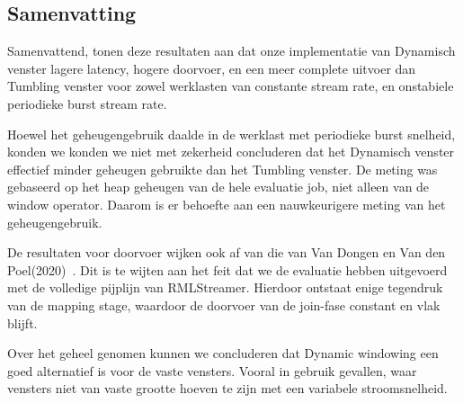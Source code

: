\subsection{Samenvatting}
\label{sec:Result Summary}

Samenvattend, tonen deze resultaten aan dat onze implementatie van Dynamisch venster 
lagere latency, hogere doorvoer, en een meer complete 
uitvoer dan Tumbling venster voor zowel 
werklasten van constante stream rate, en onstabiele periodieke burst stream rate.

Hoewel het geheugengebruik daalde in de werklast met periodieke burst snelheid, konden we 
konden we niet met zekerheid concluderen dat het Dynamisch venster effectief minder geheugen gebruikte
dan het Tumbling venster. De meting was gebaseerd op het heap geheugen van de 
hele evaluatie job, niet alleen van de window operator. Daarom is er behoefte aan een 
nauwkeurigere meting van het geheugengebruik. 

De resultaten voor doorvoer wijken ook af van die van Van Dongen en Van den Poel(2020)~\cite{evalution_of_spe}. 
Dit is te wijten aan het feit dat we de evaluatie hebben uitgevoerd met de volledige pijplijn van RMLStreamer. Hierdoor ontstaat enige tegendruk van de mapping stage, 
waardoor de doorvoer van de join-fase constant en vlak blijft.    

Over het geheel genomen kunnen we concluderen dat Dynamic windowing een goed alternatief is voor de vaste 
vensters. Vooral in gebruik 
gevallen, waar vensters niet van vaste grootte hoeven te zijn met een variabele stroomsnelheid.  

